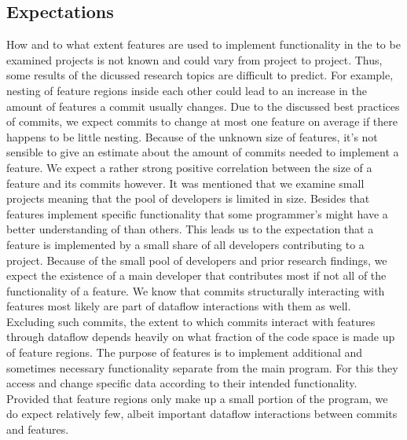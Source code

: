 \subsection*{Expectations}\label{sec:expectations}

How and to what extent features are used to implement functionality in the to be examined projects is not known and could vary from project to project.
Thus, some results of the dicussed research topics are difficult to predict.
For example, nesting of feature regions inside each other could lead to an increase in the amount of features a commit usually changes.
Due to the discussed best practices of commits, we expect commits to change at most one feature on average if there happens to be little nesting.
Because of the unknown size of features, it's not sensible to give an estimate about the amount of commits needed to implement a feature.
We expect a rather strong positive correlation between the size of a feature and its commits however.
It was mentioned that we examine small projects meaning that the pool of developers is limited in size. 
Besides that features implement specific functionality that some programmer's might have a better understanding of than others.
This leads us to the expectation that a feature is implemented by a small share of all developers contributing to a project.
Because of the small pool of developers and prior research findings, we expect the existence of a main developer that contributes most if not all of the functionality of a feature.
We know that commits structurally interacting with features most likely are part of dataflow interactions with them as well.
Excluding such commits, the extent to which commits interact with features through dataflow depends heavily on what fraction of the code space is made up of feature regions.
The purpose of features is to implement additional and sometimes necessary functionality separate from the main program.
For this they access and change specific data according to their intended functionality.
Provided that feature regions only make up a small portion of the program, we do expect relatively few, albeit important dataflow interactions between commits and features.

